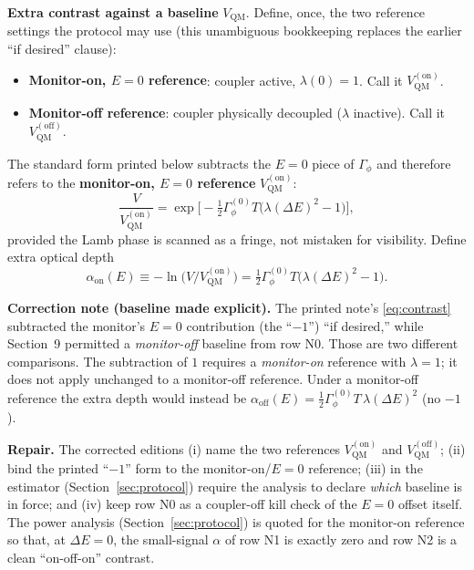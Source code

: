 \documentclass[11pt]{article}
\newenvironment{correction}{%
  \par\medskip
  \begin{lrbox}{\corrsave}%
  \begin{minipage}{\dimexpr\linewidth-2\fboxsep}%
    \small
}{%
  \end{minipage}%
  \end{lrbox}%
  \noindent\fcolorbox{corrrule}{corrback}{\usebox\corrsave}%
  \par\medskip
}
\theoremstyle{definition}
\theoremstyle{plain}
\begin{document}
\textbf{Extra contrast against a baseline} $V_{\mathrm{QM}}$. Define, once, the two reference settings the
protocol may use (this unambiguous bookkeeping replaces the earlier ``if desired'' clause):
\begin{itemize}
\item \textbf{Monitor-on, $E=0$ reference}: coupler active, $\lambda(0)=1$. Call it $V_{\mathrm{QM}}^{(\mathrm{on})}$.
\item \textbf{Monitor-off reference}: coupler physically decoupled ($\lambda$ inactive). Call it $V_{\mathrm{QM}}^{(\mathrm{off})}$.
\end{itemize}
The standard form printed below subtracts the $E=0$ piece of $\Gamma_\phi$ and therefore refers to the
\textbf{monitor-on, $E=0$ reference} $V_{\mathrm{QM}}^{(\mathrm{on})}$:
\begin{equation}
\frac{V}{V_{\mathrm{QM}}^{(\mathrm{on})}} = \exp\!\Big[ -\tfrac12 \Gamma_\phi^{(0)} T \big( \lambda(\Delta E)^2 - 1 \big) \Big],
\label{eq:contrast}
\end{equation}
provided the Lamb phase is scanned as a fringe, not mistaken for visibility. Define extra optical depth
\begin{equation}
\alpha_{\mathrm{on}}(E) \equiv -\ln\!\Big( V / V_{\mathrm{QM}}^{(\mathrm{on})} \Big) = \tfrac12 \Gamma_\phi^{(0)}T \big( \lambda(\Delta E)^2 - 1 \big).
\label{eq:extra}
\end{equation}

\begin{correction}
\noindent\textbf{Correction note (baseline made explicit).}
The printed note's \eqref{eq:contrast} subtracted the monitor's $E=0$ contribution
(the ``$-1$'') ``if desired,'' while Section~9 permitted a \emph{monitor-off} baseline from row N0. Those
are two different comparisons. The subtraction of $1$ requires a \emph{monitor-on} reference with
$\lambda=1$; it does not apply unchanged to a monitor-off reference. Under a monitor-off reference the
extra depth would instead be $\alpha_{\mathrm{off}}(E) = \tfrac12 \Gamma_\phi^{(0)}T\, \lambda(\Delta E)^2$
(no $-1$).\medskip\par\noindent
\textbf{Repair.} The corrected editions (i) name the two references $V_{\mathrm{QM}}^{(\mathrm{on})}$ and
$V_{\mathrm{QM}}^{(\mathrm{off})}$; (ii) bind the printed ``$-1$'' form to the monitor-on/$E{=}0$ reference;
(iii) in the estimator (Section~\ref{sec:protocol}) require the analysis to declare \emph{which} baseline is in
force; and (iv) keep row N0 as a coupler-off kill check of the $E{=}0$ offset itself. The power analysis
(Section~\ref{sec:protocol}) is quoted for the monitor-on reference so that, at $\Delta E=0$, the small-signal
$\alpha$ of row N1 is exactly zero and row N2 is a clean ``on-off-on'' contrast.
\end{correction}
\end{document}
